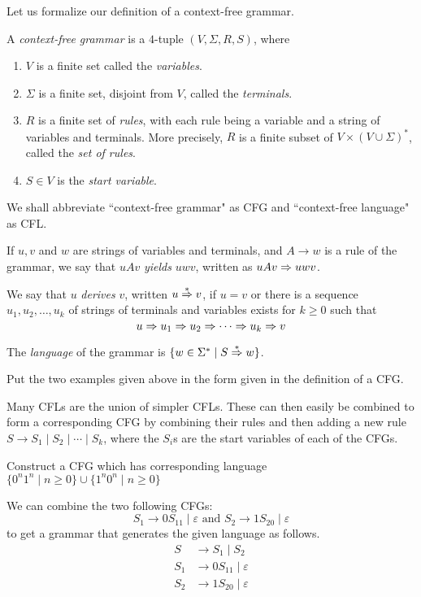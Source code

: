\vspace{3mm}
Let us formalize our definition of a context-free grammar.
\begin{definition}
A \textit{context-free grammar} is a $4$-tuple $(V,\Sigma,R,S)$, where
\begin{enumerate}
    \item $V$ is a finite set called the \textit{variables}.
    \item $\Sigma$ is a finite set, disjoint from $V$, called the \textit{terminals}.
    \item $R$ is a finite set of \textit{rules}, with each rule being a variable and a string of variables and terminals. More precisely, $R$ is a finite subset of $V\times (V\cup\Sigma)^*$, called the \textit{set of rules}.
    \item $S\in V$ is the \textit{start variable}.
\end{enumerate}
\end{definition}

We shall abbreviate ``context-free grammar" as CFG and ``context-free language" as CFL.

If $u,v$ and $w$ are strings of variables and terminals, and $A\to w$ is a rule of the grammar, we say that $uAv$ \textit{yields} $uwv$, written as $uAv\Rightarrow uwv$.

We say that $u$ \textit{derives} $v$, written $u\overset{*}{\Rightarrow} v$, if $u=v$ or there is a sequence $u_1,u_2,\ldots,u_k$ of strings of terminals and variables exists for $k\geq 0$ such that $$u\Rightarrow u_1\Rightarrow u_2 \Rightarrow\cdots\Rightarrow u_k\Rightarrow v$$

The \textit{language} of the grammar is $\{w\in\Sigma^*\mid S\overset{*}{\Rightarrow} w\}$.

\begin{exercise}
Put the two examples given above in the form given in the definition of a CFG.
\end{exercise}

Many CFLs are the union of simpler CFLs. These can then easily be combined to form a corresponding CFG by combining their rules and then adding a new rule $S\to S_1\mid S_2\mid\cdots\mid S_k$, where the $S_i$s are the start variables of each of the CFGs.

\begin{exercise}
Construct a CFG which has corresponding language $\{0^n1^n\mid n\geq 0\}\cup\{1^n0^n\mid n\geq 0\}$
\end{exercise}
\begin{solution}
We can combine the two following CFGs:
$$S_1\to 0S_11\mid\varepsilon \text{ and } S_2\to 1S_20\mid\varepsilon$$
to get a grammar that generates the given language as follows.
\begin{align*}
    S&\to S_1\mid S_2 \\
    S_1&\to 0S_11\mid\varepsilon \\
    S_2&\to 1S_20\mid\varepsilon
\end{align*}
\end{solution}

